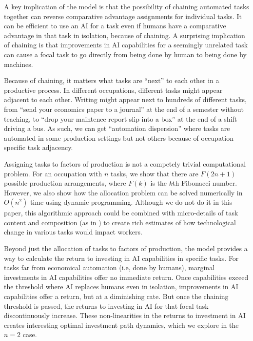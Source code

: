 \documentclass{article}
\theoremstyle{plain}
\theoremstyle{plain}
\begin{document}
A key implication of the model is that the possibility of chaining automated tasks together can reverse comparative advantage assignments for individual tasks. 
It can be efficient to use an AI for a task even if humans have a comparative advantage in that task in isolation, because of chaining.
A surprising implication of chaining is that improvements in AI capabilities for a seemingly unrelated task can cause a focal task to go directly from being done by human to being done by machines.

Because of chaining, it matters what tasks are ``next'' to each other in a productive process.
In different occupations, different tasks might appear adjacent to each other. 
Writing might appear next to hundreds of different tasks, from ``send your economics paper to a journal'' at the end of a semester without teaching, to ``drop your maintence report slip into a box'' at the end of a shift driving a bus.
As such, we can get ``automation dispersion'' where tasks are automated in some production settings but not others because of occupation-specific task adjacency.

Assigning tasks to factors of production is not a competely trivial computational problem.
For an occupation with $n$ tasks, we show that there are $F(2n + 1)$ possible production arrangements, where $F(k)$ is the $k$th Fibonacci number.
However, we also show how the allocation problem can be solved numerically in $O(n^2)$ time using dynamic programming.
Although we do not do it in this paper, this algorithmic approach could be combined with micro-details of task content and composition (as in \cite{frey2017future, felten2021occupational, eloundou2023gpts}) to create rich estimates of how technological change in various tasks would impact workers. 

Beyond just the allocation of tasks to factors of production, the model provides a way to calculate the return to investing in AI capabilities in specific tasks.
For tasks far from economical automation (i.e, done by humans), marginal investments in AI capabilities offer no immediate return.
Once capabilities exceed the threshold where AI replaces humans even in isolation, improvements in AI capabilities offer a return, but at a diminishing rate.
But once the chaining threshold is passed, the returns to investing in AI for that focal task discontinuously increase.
These non-linearities in the returns to investment in AI creates interesting optimal investment path dynamics, which we explore in the $n = 2$ case.
\end{document}
